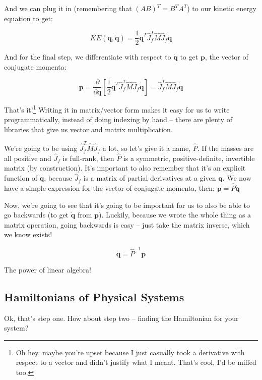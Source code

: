 \documentclass[]{article}
\begin{document}
And we can plug it in (remembering that \((A B)^T = B^T A^T\)) to our kinetic
energy equation to get:

\[
KE(\mathbf{q},\dot{\mathbf{q}}) = \frac{1}{2} \dot{\mathbf{q}}^T \hat{J}_f^T
    \hat{M} \hat{J}_f \dot{\mathbf{q}}
\]

And for the final step, we differentiate with respect to \(\dot{\mathbf{q}}\) to
get \(\mathbf{p}\), the vector of conjugate momenta:

\[
\mathbf{p} = \frac{\partial}{\partial \dot{\mathbf{q}}} \left[
    \frac{1}{2} \dot{\mathbf{q}}^T \hat{J}_f^T \hat{M} \hat{J}_f \dot{\mathbf{q}}
  \right]
  = \hat{J}_f^T \hat{M} \hat{J}_f \dot{\mathbf{q}}
\]

That's it!\footnote{Oh hey, maybe you're upset because I just casually took a
  derivative with respect to a vector and didn't justify what I meant. That's
  cool, I'd be miffed too.} Writing it in matrix/vector form makes it easy for
us to write programmatically, instead of doing indexing by hand -- there are
plenty of libraries that give us vector and matrix multiplication.

We're going to be using \(\hat{J}_f^T \hat{M} \hat{J}_f\) a lot, so let's give
it a name, \(\hat{P}\). If the masses are all positive and \(\hat{J}_f\) is
full-rank, then \(\hat{P}\) is a symmetric, positive-definite, invertible matrix
(by construction). It's important to also remember that it's an explicit
function of \(\mathbf{q}\), because \(\hat{J}_f\) is a matrix of partial
derivatives at a given \(\mathbf{q}\). We now have a simple expression for the
vector of conjugate momenta, then: \(\mathbf{p} = \hat{P} \dot{\mathbf{q}}\)

Now, we're going to see that it's going to be important for us to also be able
to go backwards (to get \(\dot{\mathbf{q}}\) from \(\mathbf{p}\)). Luckily,
because we wrote the whole thing as a matrix operation, going backwards is easy
-- just take the matrix inverse, which we know exists!

\[
\dot{\mathbf{q}} = \hat{P}^{-1} \mathbf{p}
\]

The power of linear algebra!

\subsection{Hamiltonians of Physical
Systems}\label{hamiltonians-of-physical-systems}

Ok, that's step one. How about step two -- finding the Hamiltonian for your
system?
\end{document}
